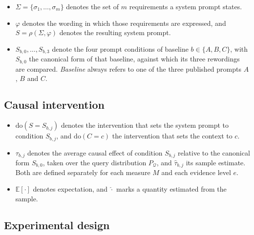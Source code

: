 \documentclass[12pt,a4paper,oneside]{scrreprt}
\begin{document}
\begin{itemize}
    \item $\Sigma = \{\sigma_1,\ldots,\sigma_m\}$ denotes the set of $m$ requirements a system prompt states.
    \item $\varphi$ denotes the wording in which those requirements are expressed, and $S = \rho(\Sigma,\varphi)$ denotes the resulting system prompt.
    \item $S_{b,0},\ldots,S_{b,3}$ denote the four prompt conditions of baseline $b \in \{A,B,C\}$, with $S_{b,0}$ the canonical form of that baseline, against which its three rewordings are compared. \textit{Baseline} always refers to one of the three published prompts $A$, $B$ and $C$.
\end{itemize}

\subsection*{Causal intervention}

\begin{itemize}
    \item $\mathrm{do}(S = S_{b,j})$ denotes the intervention that sets the system prompt to condition $S_{b,j}$, and $\mathrm{do}(C = c)$ the intervention that sets the context to $c$.
    \item $\tau_{b,j}$ denotes the average causal effect of condition $S_{b,j}$ relative to the canonical form $S_{b,0}$, taken over the query distribution $P_{\mathcal{Q}}$, and $\hat{\tau}_{b,j}$ its sample estimate. Both are defined separately for each measure $M$ and each evidence level $e$.
     \item $\mathbb{E}[\cdot]$ denotes expectation, and $\hat{\cdot}$ marks a quantity estimated from the sample.
\end{itemize}

\subsection*{Experimental design}
\end{document}
